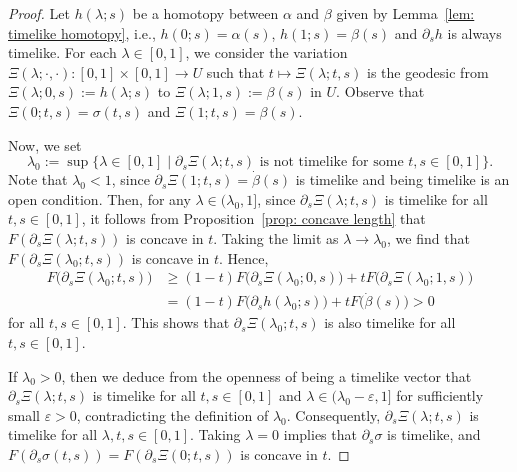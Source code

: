 \documentclass[10pt,a4paper]{amsart}
\newcommand{\del}{\partial}
\newcommand{\lra}{\longrightarrow}
\providecommand{\todo}[1]{\P \textbf{#1} \P}
\newcommand{\ve}{\varepsilon}
\begin{document}
\begin{proof}
Let $h(\lambda;s)$ be a homotopy between $\alpha$ and $\beta$ given by Lemma~\ref{lem: timelike homotopy}, i.e.,
$h(0;s)=\alpha(s)$, $h(1;s)=\beta(s)$ and $\partial_s h$ is always timelike.
For each $\lambda \in [0,1]$, we consider the variation $\Xi(\lambda;\cdot,\cdot) \colon [0,1] \times [0,1] \lra U$ such that $t \longmapsto \Xi(\lambda;t,s)$ is the geodesic from $\Xi(\lambda;0,s):=h(\lambda;s)$ to $\Xi(\lambda;1,s):=\beta(s)$ in $U$.
Observe that $\Xi(0;t,s)=\sigma(t,s)$ and $\Xi(1;t,s)= \beta(s)$.

Now, we set
\[ \lambda_0:=\sup\bigl\{ \lambda \in [0,1] \mid \del_s \Xi(\lambda;t,s) \text{ is not timelike for some } t,s \in [0,1] \bigr\}. \]
Note that $\lambda_0 < 1$, since $\partial_s\Xi(1;t,s)=\dot\beta(s)$ is timelike and being timelike is an open condition.
%
Then, for any $\lambda \in (\lambda_0,1]$, since $\del_s \Xi(\lambda;t,s)$ is timelike for all $t,s \in [0,1]$, it follows from Proposition~\ref{prop: concave length} that
$F(\del_s \Xi(\lambda;t,s))$ is concave in $t$.
Taking the limit as $\lambda \to \lambda_0$, we find that $F(\del_s \Xi(\lambda_0;t,s))$ is concave in $t$.
Hence,
\begin{align*}
F\bigl( \del_s \Xi(\lambda_0;t,s) \bigr)
&\ge (1-t)F\bigl( \del_s \Xi(\lambda_0;0,s) \bigr) +tF\bigl( \del_s \Xi(\lambda_0;1,s)\bigr) \\
&= (1-t)F\bigl( \del_s h(\lambda_0;s)\bigr) +tF\bigl( \dot{\beta}(s) \bigr) >0
\end{align*}
for all $t,s \in [0,1]$.
This shows that $\partial_s\Xi(\lambda_0;t,s)$ is also timelike for all $t,s \in [0,1]$.

If $\lambda_0>0$, then we deduce from the openness of being a timelike vector that $\partial_s\Xi(\lambda;t,s)$ is timelike for all $t,s \in [0,1]$ and $\lambda \in (\lambda_0-\ve,1]$ for sufficiently small $\ve>0$, contradicting the definition of $\lambda_0$.
Consequently, $\partial_s\Xi(\lambda;t,s)$ is timelike for all $\lambda,t,s \in [0,1]$.
Taking $\lambda=0$ implies that $\del_s \sigma$ is timelike, and $F(\del_s \sigma(t,s))=F(\del_s \Xi(0;t,s))$ is concave in $t$. 
\end{proof}
\end{document}
